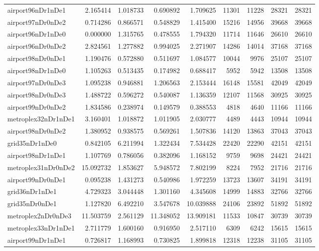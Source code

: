 \begin{longtable}{|l|r|r|r|r|r|r|r|r|}
airport96nDr1nDe1 & 2.165414 & 1.018733 & 0.690892 & 1.709625 & 11301 & 11228 & 28321 & 28321 \\
airport97nDr0nDe2 & 0.714286 & 0.866571 & 0.548829 & 1.415400 & 15216 & 14956 & 39668 & 39668 \\
airport96nDr1nDe0 & 0.000000 & 1.315765 & 0.478555 & 1.794320 & 11714 & 11646 & 26610 & 26610 \\
airport96nDr0nDe2 & 2.824561 & 1.277882 & 0.994025 & 2.271907 & 14286 & 14014 & 37168 & 37168 \\
airport98nDr0nDe1 & 1.190476 & 0.572880 & 0.511697 & 1.084577 & 10044 & 9976 & 25107 & 25107 \\
airport98nDr1nDe0 & 1.105263 & 0.513435 & 0.174982 & 0.688417 & 5952 & 5942 & 13508 & 13508 \\
airport97nDr0nDe3 & 1.095238 & 0.946881 & 1.206563 & 2.153444 & 16148 & 15581 & 42049 & 42049 \\
airport98nDr0nDe3 & 1.488722 & 0.596272 & 0.540087 & 1.136359 & 12107 & 11568 & 30925 & 30925 \\
airport99nDr0nDe2 & 1.834586 & 0.238974 & 0.149579 & 0.388553 & 4818 & 4640 & 11166 & 11166 \\
metroplex32nDr1nDe1 & 3.160401 & 1.018872 & 1.011905 & 2.030777 & 4489 & 4443 & 10944 & 10944 \\
airport98nDr0nDe2 & 1.380952 & 0.938575 & 0.569261 & 1.507836 & 14120 & 13863 & 37043 & 37043 \\
grid35nDr1nDe0 & 0.842105 & 6.211994 & 1.322434 & 7.534428 & 22420 & 22290 & 42151 & 42151 \\
airport98nDr1nDe1 & 1.107769 & 0.786056 & 0.382096 & 1.168152 & 9759 & 9698 & 24421 & 24421 \\
metroplex31nDr0nDe2 & 15.092732 & 1.853627 & 5.948572 & 7.802199 & 8224 & 7952 & 21716 & 21716 \\
airport99nDr0nDe1 & 0.095238 & 1.431273 & 0.540986 & 1.972259 & 13723 & 13607 & 34191 & 34191 \\
grid36nDr1nDe1 & 4.729323 & 3.044448 & 1.301160 & 4.345608 & 14999 & 14883 & 32766 & 32766 \\
grid35nDr0nDe1 & 1.127820 & 6.492210 & 3.547678 & 10.039888 & 24106 & 23892 & 51892 & 51892 \\
metroplex2nDr0nDe3 & 11.503759 & 2.561129 & 11.348052 & 13.909181 & 11533 & 10847 & 30739 & 30739 \\
metroplex33nDr1nDe1 & 2.711779 & 1.600160 & 0.916950 & 2.517110 & 6309 & 6242 & 15615 & 15615 \\
airport99nDr1nDe1 & 0.726817 & 1.168993 & 0.730825 & 1.899818 & 12318 & 12238 & 31105 & 31105 \\

\end{longtable}
